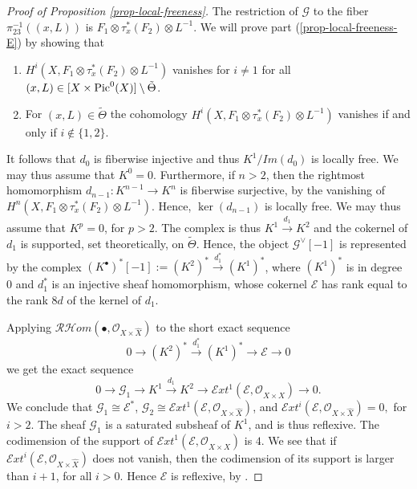 \documentclass[12pt]{amsart}
\numberwithin{equation}{subsection}
\theoremstyle{plain}
\theoremstyle{definition}
\newcommand{\E}{{\mathcal E}}
\newcommand{\G}{{\mathcal G}}
\newcommand{\R}{{\mathcal R}}
\newcommand{\RightArrowOf}[1]{\stackrel{#1}{\rightarrow}}
\newcommand{\StructureSheaf}[1]{{\mathcal O}_{#1}}
\newcommand{\Pic}{{\rm Pic}}
\newcommand{\SheafHom}{{\mathcal H}om}
\newcommand{\SheafExt}{{\mathcal E}xt}
\begin{document}
\begin{proof}[Proof of Proposition \ref{prop-local-freeness}]
The restriction of $\G$ to the fiber $\pi_{23}^{-1}((x,L))$ is $F_1\otimes \tau_x^*(F_2)\otimes L^{-1}$.
We will prove part (\ref{prop-local-freeness-E}) by showing that 
\begin{enumerate}
\item[(i)]
$H^i(X,F_1\otimes\tau_x^*(F_2)\otimes L^{-1})$ vanishes for $i\neq 1$ for all $(x,L)\in [X\times \Pic^0(X)]\setminus\tilde{\Theta}$.
\item[(ii)]
For $(x,L)\in \tilde{\Theta}$ the cohomology 
$H^i(X,F_1\otimes\tau_x^*(F_2)\otimes L^{-1})$ vanishes if and only if  $i\not\in \{1,2\}$. 
\end{enumerate}
It follows that $d_0$ is fiberwise injective and thus $K^1/Im(d_0)$ is locally free. We may thus assume that $K^0=0.$ Furthermore, if $n>2$, then the rightmost homomorphism $d_{n-1}:K^{n-1}\rightarrow K^n$ is fiberwise surjective, by the vanishing of 
$H^n(X,F_1\otimes\tau_x^*(F_2)\otimes L^{-1})$. Hence, $\ker(d_{n-1})$ is locally free. We may thus assume that $K^p=0$, for $p>2$.  The complex is thus $K^1\RightArrowOf{d_1} K^2$ and the cokernel of $d_1$ is supported, set theoretically, on $\tilde{\Theta}$. Hence, the object $\G^\vee[-1]$ is represented by the complex
$(K^\bullet)^*[-1]:=(K^2)^*\RightArrowOf{d_1^*} (K^1)^*$, where $(K^1)^*$ is in degree $0$ and $d_1^*$ is an injective sheaf homomorphism, whose cokernel $\E$ has rank equal to the rank $8d$ of the kernel of $d_1$. 

Applying $\R\SheafHom(\bullet,\StructureSheaf{X\times\hat{X}})$ to the short exact sequence
\[
0\rightarrow (K^2)^*\RightArrowOf{d_1^*} (K^1)^* \rightarrow \E\rightarrow 0
\]
we get the exact sequence
\[
0\rightarrow \G_1 \rightarrow K^1 \RightArrowOf{d_1} K^2 \rightarrow \SheafExt^1(\E,\StructureSheaf{X\times\hat{X}}) \rightarrow 0.
\]
We conclude that $\G_1\cong \E^*$,
$\G_2\cong \SheafExt^1(\E,\StructureSheaf{X\times\hat{X}})$, and $\SheafExt^i(\E,\StructureSheaf{X\times\hat{X}})=0,$ for $i>2$. 
The sheaf $\G_1$ is a saturated subsheaf of $K^1$, and is thus reflexive. The codimension of the support of 
$\SheafExt^1(\E,\StructureSheaf{X\times\hat{X}})$ is $4$. 
We see that if $\SheafExt^i(\E,\StructureSheaf{X\times\hat{X}})$ does not vanish, then the codimension of its support 
 is larger than $i+1$, for all $i>0$. Hence $\E$ is reflexive, by \cite[Prop. 1.1.10(3')]{huybrechts-lehn}.



\end{proof}
\end{document}
